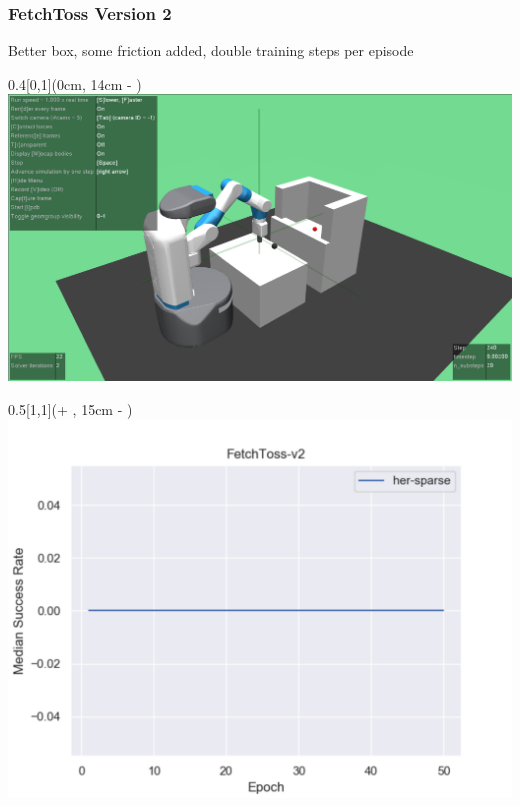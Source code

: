 


\begin{frame}
	\frametitle{FetchToss Version 2}	
	\vspace{1cm}
	
	Better box, some friction added, double training steps per episode
	
	\begin{textblock*}{0.4\paperwidth}[0,1](0cm, 14cm - \PraesentationSeitenrand)%
		\includegraphics[width=0.4\paperwidth]{./Ressourcen/Figures/FetchToss-v2.pdf}
	\end{textblock*}
	
	\begin{textblock*}{0.5\paperwidth}[1,1](\textwidth + \PraesentationSeitenrand, 15cm - \PraesentationSeitenrand)%
		\includegraphics[width=0.5\paperwidth]{./Ressourcen/Figures/fig_FetchToss-v2.pdf}
	\end{textblock*}
	
	
\end{frame}
\clearpage

